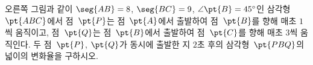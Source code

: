 \noindent\begin{minipage}[t]{0.58\linewidth}\vspace{0pt}\raggedright 오른쪽 그림과 같이 $\seg{AB}=8$, $\seg{BC}=9$, $\angle\pt{B}=45^\circ$인 삼각형~$\pt{ABC}$에서 점~$\pt{P}$는 점~$\pt{A}$에서 출발하여 점~$\pt{B}$를 향해 매초 $1$씩 움직이고, 점~$\pt{Q}$는 점~$\pt{B}$에서 출발하여 점~$\pt{C}$를 향해 매초 $3$씩 움직인다. 두 점~$\pt{P}$, $\pt{Q}$가 동시에 출발한 지 $2$초 후의 삼각형~$\pt{PBQ}$의 넓이의 변화율을 구하시오.\end{minipage}\hfill\begin{minipage}[t]{0.4\linewidth}\vspace{0pt}\centering \resizebox{\ifdim\width>\linewidth\linewidth\else\width\fi}{!}{}\end{minipage}\par
